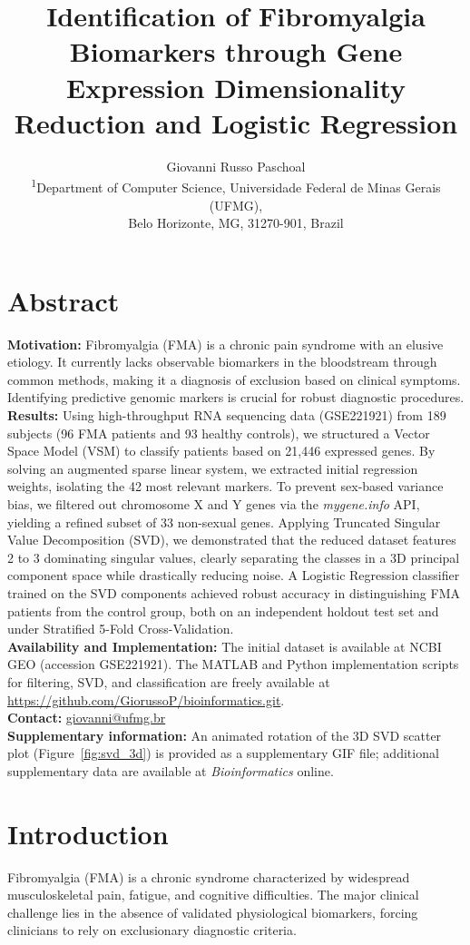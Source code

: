 \documentclass[twocolumn]{article}
\title{Identification of Fibromyalgia Biomarkers through Gene Expression Dimensionality Reduction and Logistic Regression}
\author{
    Giovanni Russo Paschoal \\
    \small \textsuperscript{1}Department of Computer Science, Universidade Federal de Minas Gerais (UFMG),\\
    \small Belo Horizonte, MG, 31270-901, Brazil
}
\date{}
\begin{document}
\maketitle

\section*{Abstract}
\textbf{Motivation:} Fibromyalgia (FMA) is a chronic pain syndrome with an elusive etiology. It currently lacks observable biomarkers in the bloodstream through common methods, making it a diagnosis of exclusion based on clinical symptoms. Identifying predictive genomic markers is crucial for robust diagnostic procedures. \\
\textbf{Results:} Using high-throughput RNA sequencing data (GSE221921) from 189 subjects (96 FMA patients and 93 healthy controls), we structured a Vector Space Model (VSM) to classify patients based on 21,446 expressed genes. By solving an augmented sparse linear system, we extracted initial regression weights, isolating the 42 most relevant markers. To prevent sex-based variance bias, we filtered out chromosome X and Y genes via the \textit{mygene.info} API, yielding a refined subset of 33 non-sexual genes. Applying Truncated Singular Value Decomposition (SVD), we demonstrated that the reduced dataset features 2 to 3 dominating singular values, clearly separating the classes in a 3D principal component space while drastically reducing noise. A Logistic Regression classifier trained on the SVD components achieved robust accuracy in distinguishing FMA patients from the control group, both on an independent holdout test set and under Stratified 5-Fold Cross-Validation.\\
\textbf{Availability and Implementation:} The initial dataset is available at NCBI GEO (accession GSE221921). The MATLAB and Python implementation scripts for filtering, SVD, and classification are freely available at \url{https://github.com/GiorussoP/bioinformatics.git}.\\
\textbf{Contact:} \href{mailto:giovanni@ufmg.br}{giovanni@ufmg.br} \\
\textbf{Supplementary information:} An animated rotation of the 3D SVD scatter plot (Figure~\ref{fig:svd_3d}) is provided as a supplementary GIF file; additional supplementary data are available at \textit{Bioinformatics} online.

\section{Introduction}
Fibromyalgia (FMA) is a chronic syndrome characterized by widespread musculoskeletal pain, fatigue, and cognitive difficulties. The major clinical challenge lies in the absence of validated physiological biomarkers, forcing clinicians to rely on exclusionary diagnostic criteria.
\end{document}
